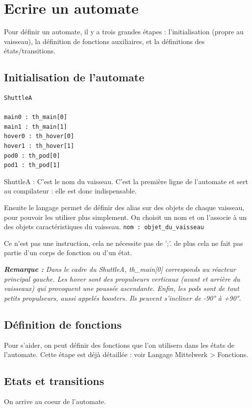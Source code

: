 \documentclass[a4paper,11pt]{article}
\begin{document}
\section{Ecrire un automate}
    Pour définir un  automate, il y a trois grandes étapes : l'initialisation (propre au vaisseau), la définition de fonctions auxiliaires, et la définitions des états/transitions.

    \subsection{Initialisation de l'automate}
        \begin{verbatim}
ShuttleA

main0 : th_main[0]
main1 : th_main[1]
hover0 : th_hover[0]
hover1 : th_hover[1]
pod0 : th_pod[0]
pod1 : th_pod[1]
        \end{verbatim}

        ShuttleA : C'est le nom du vaisseau. C'est la première ligne de l'automate et sert au compilateur : elle est donc indispensable.

        Ensuite le langage permet de définir des alias sur des objets de chaque vaisseau, pour pouvoir les utiliser plus simplement. On choisit un nom et on l'associe à un des objets caractéristiques du vaisseau. 
        \texttt{nom : objet\_du\_vaisseau}

        Ce n'est pas une instruction, cela ne nécessite pas de ';'. de plus cela ne fait pas partie d'un corps de fonction ou d'un état.

        \textit{\textbf{Remarque : }Dans le cadre du ShuttleA, th\_main[0] corresponds au réacteur principal gauche. 
        Les hover sont des propulseurs verticaux (avant et arrière du vaisseaux) qui provoquent une poussée ascendante. Enfin, les pods sont de tout petits propulseurs, aussi appelés boosters. Ils peuvent s'incliner de -90° à +90°.}

    \subsection{Définition de fonctions}
        Pour s'aider, on peut définir des fonctions que l'on utilisera dans les états de l'automate. Cette étape est déjà détaillée : voir Langage Mittelwerk > Fonctions.

    \subsection{Etats et transitions}
        On arrive au coeur de l'automate. 
         
\end{document}
